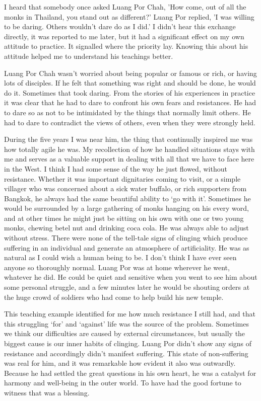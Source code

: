 I heard that somebody once asked Luang Por Chah, 'How come, out of all
the monks in Thailand, you stand out as different?' Luang Por replied,
'I was willing to be daring. Others wouldn't dare do as I did.' I didn't
hear this exchange directly, it was reported to me later, but it had a
significant effect on my own attitude to practice. It signalled where
the priority lay. Knowing this about his attitude helped me to
understand his teachings better.

Luang Por Chah wasn't worried about being popular or famous or rich, or
having lots of disciples. If he felt that something was right and should
be done, he would do it. Sometimes that took daring. From the stories of
his experiences in practice it was clear that he had to dare to confront
his own fears and resistances. He had to dare so as not to be
intimidated by the things that normally limit others. He had to dare to
contradict the views of others, even when they were strongly held.

During the five years I was near him, the thing that continually
inspired me was how totally agile he was. My recollection of how he
handled situations stays with me and serves as a valuable support in
dealing with all that we have to face here in the West. I think I had
some sense of the way he just flowed, without resistance. Whether it was
important dignitaries coming to visit, or a simple villager who was
concerned about a sick water buffalo, or rich supporters from Bangkok,
he always had the same beautiful ability to `go with it'. Sometimes he
would be surrounded by a large gathering of monks hanging on his every
word, and at other times he might just be sitting on his own with one or
two young monks, chewing betel nut and drinking coca cola. He was always
able to adjust without stress. There were none of the tell-tale signs of
clinging which produce suffering in an individual and generate an
atmosphere of artificiality. He was as natural as I could wish a human
being to be. I don't think I have ever seen anyone so thoroughly normal.
Luang Por was at home wherever he went, whatever he did. He could be
quiet and sensitive when you went to see him about some personal
struggle, and a few minutes later he would be shouting orders at the
huge crowd of soldiers who had come to help build his new temple.

This teaching example identified for me how much resistance I still had,
and that this struggling `for' and `against' life was the source of the
problem. Sometimes we think our difficulties are caused by external
circumstances, but usually the biggest cause is our inner habits of
clinging. Luang Por didn't show any signs of resistance and accordingly
didn't manifest suffering. This state of non-suffering was real for him,
and it was remarkable how evident it also was outwardly. Because he had
settled the great questions in his own heart, he was a catalyst for
harmony and well-being in the outer world. To have had the good fortune
to witness that was a blessing.

